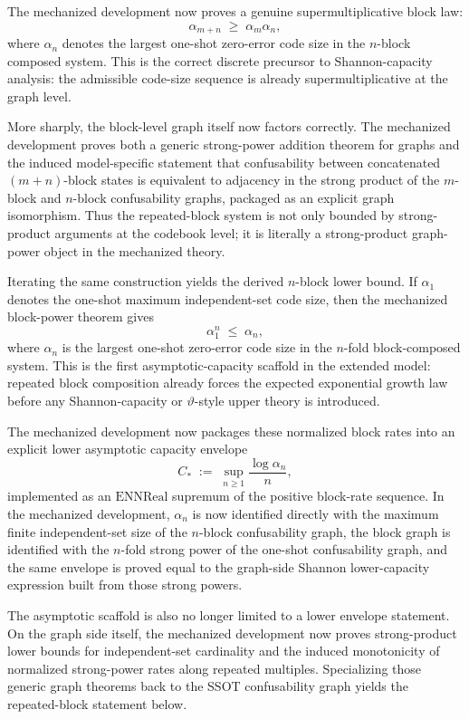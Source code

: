 The mechanized development now proves a genuine supermultiplicative block law:
\[
\alpha_{m+n}\;\ge\;\alpha_m\alpha_n,
\]
where $\alpha_n$ denotes the largest one-shot zero-error code size in the $n$-block composed system. This is the correct discrete precursor to Shannon-capacity analysis: the admissible code-size sequence is already supermultiplicative at the graph level.

More sharply, the block-level graph itself now factors correctly. The mechanized development proves both a generic strong-power addition theorem for graphs and the induced model-specific statement that confusability between concatenated $(m+n)$-block states is equivalent to adjacency in the strong product of the $m$-block and $n$-block confusability graphs, packaged as an explicit graph isomorphism. Thus the repeated-block system is not only bounded by strong-product arguments at the codebook level; it is literally a strong-product graph-power object in the mechanized theory.

Iterating the same construction yields the derived $n$-block lower bound. If $\alpha_1$ denotes the one-shot maximum independent-set code size, then the mechanized block-power theorem gives
\[
\alpha_1^n \;\le\; \alpha_n,
\]
where $\alpha_n$ is the largest one-shot zero-error code size in the $n$-fold block-composed system. This is the first asymptotic-capacity scaffold in the extended model: repeated block composition already forces the expected exponential growth law before any Shannon-capacity or $\vartheta$-style upper theory is introduced.

The mechanized development now packages these normalized block rates into an explicit lower asymptotic capacity envelope
\[
C_* \;:=\; \sup_{n\ge 1} \frac{\log \alpha_n}{n},
\]
implemented as an $\mathrm{ENNReal}$ supremum of the positive block-rate sequence. In the mechanized development, $\alpha_n$ is now identified directly with the maximum finite independent-set size of the $n$-block confusability graph, the block graph is identified with the $n$-fold strong power of the one-shot confusability graph, and the same envelope is proved equal to the graph-side Shannon lower-capacity expression built from those strong powers.

The asymptotic scaffold is also no longer limited to a lower envelope statement. On the graph side itself, the mechanized development now proves strong-product lower bounds for independent-set cardinality and the induced monotonicity of normalized strong-power rates along repeated multiples. Specializing those generic graph theorems back to the SSOT confusability graph yields the repeated-block statement below.

